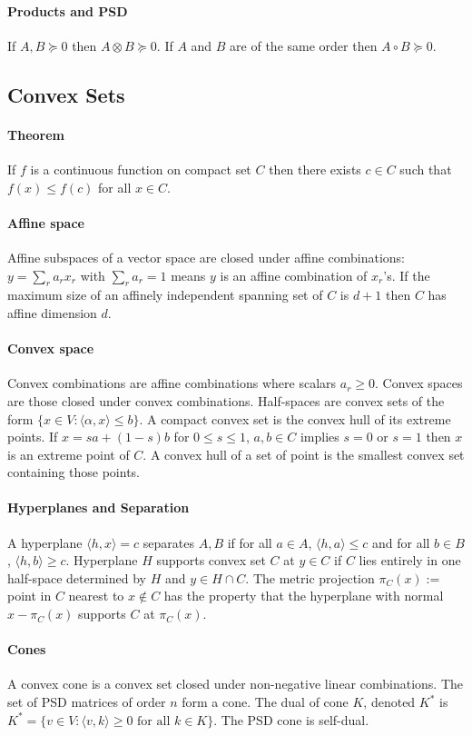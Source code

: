 \documentclass[letterpaper,11pt,oneside,onecolumn]{article}
\begin{document}
\paragraph{Products and PSD} If $A, B\succcurlyeq 0$ then $A\otimes B \succcurlyeq 0$. If $A$ and $B$ are of the same order then $A\circ B \succcurlyeq 0$.
\subsection*{Convex Sets}
\paragraph{Theorem} If $f$ is a continuous function on compact set $C$ then there exists $c\in C$ such that $f(x) \leq f(c)$ for all $x \in C$.
\paragraph{Affine space} Affine subspaces of a vector space are closed under affine combinations: $y = \sum_r a_r x_r$ with $\sum_r a_r =1$ means $y$ is an affine combination of $x_r$'s. If the maximum size of an affinely independent spanning set of $C$ is $d+1$ then $C$ has affine dimension $d$.
\paragraph{Convex space} Convex combinations are affine combinations where scalars $a_r \geq 0$. Convex spaces are those closed under convex combinations. Half-spaces are convex sets of the form $\{x \in V: \langle \alpha, x \rangle \leq b\}$. A compact convex set is the convex hull of its extreme points. If $x = sa + (1-s)b$ for $0\leq s \leq 1$, $a,b \in C$ implies $s=0$ or $s=1$ then $x$ is an extreme point of $C$. A convex hull of a set of point is the smallest convex set containing those points.
\paragraph{Hyperplanes and Separation}
A hyperplane $\langle h, x\rangle = c$ separates $A,B$ if for all $a \in A$, $\langle h, a\rangle \leq c$ and for all $b \in B$, $\langle h, b \rangle \geq c$. Hyperplane $H$ supports convex set $C$ at $y \in C$ if $C$ lies entirely in one half-space determined by $H$ and $y \in H \cap C$. The metric projection $\pi_C(x) :=$ point in $C$ nearest to $x \not\in C$ has the property that the hyperplane with normal $x - \pi_C(x)$ supports $C$ at $\pi_C(x)$.
\paragraph{Cones} A convex cone is a convex set closed under non-negative linear combinations. The set of PSD matrices of order $n$ form a cone. The dual of cone $K$, denoted $K^*$ is $K^*=\{v \in V: \langle v,k \rangle \geq 0 \text{ for all } k \in K \}$. The PSD cone is self-dual.
\end{document}
